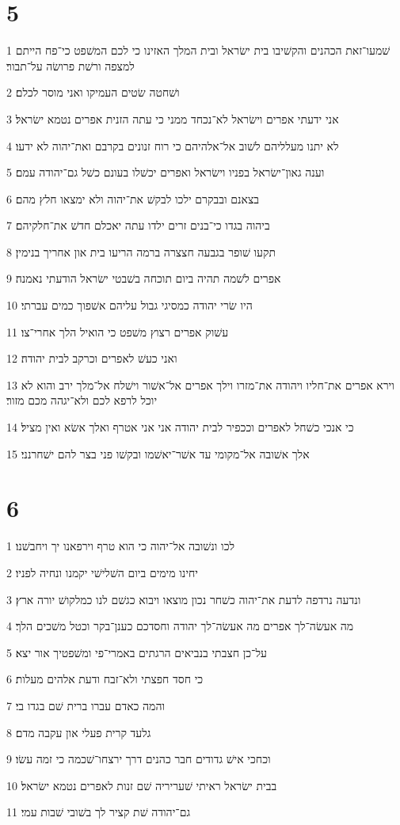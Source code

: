 \chapter{5}

\par 1 שׁמעו־זאת הכהנים והקשׁיבו בית ישׂראל ובית המלך האזינו כי לכם המשׁפט כי־פח הייתם למצפה ורשׁת פרושׂה על־תבור׃
\par 2 ושׁחטה שׂטים העמיקו ואני מוסר לכלם׃
\par 3 אני ידעתי אפרים וישׂראל לא־נכחד ממני כי עתה הזנית אפרים נטמא ישׂראל׃
\par 4 לא יתנו מעלליהם לשׁוב אל־אלהיהם כי רוח זנונים בקרבם ואת־יהוה לא ידעו׃
\par 5 וענה גאון־ישׂראל בפניו וישׂראל ואפרים יכשׁלו בעונם כשׁל גם־יהודה עמם׃
\par 6 בצאנם ובבקרם ילכו לבקשׁ את־יהוה ולא ימצאו חלץ מהם׃
\par 7 ביהוה בגדו כי־בנים זרים ילדו עתה יאכלם חדשׁ את־חלקיהם׃
\par 8 תקעו שׁופר בגבעה חצצרה ברמה הריעו בית און אחריך בנימין׃
\par 9 אפרים לשׁמה תהיה ביום תוכחה בשׁבטי ישׂראל הודעתי נאמנה׃
\par 10 היו שׂרי יהודה כמסיגי גבול עליהם אשׁפוך כמים עברתי׃
\par 11 עשׁוק אפרים רצוץ משׁפט כי הואיל הלך אחרי־צו׃
\par 12 ואני כעשׁ לאפרים וכרקב לבית יהודה׃
\par 13 וירא אפרים את־חליו ויהודה את־מזרו וילך אפרים אל־אשׁור וישׁלח אל־מלך ירב והוא לא יוכל לרפא לכם ולא־יגהה מכם מזור׃
\par 14 כי אנכי כשׁחל לאפרים וככפיר לבית יהודה אני אני אטרף ואלך אשׂא ואין מציל׃
\par 15 אלך אשׁובה אל־מקומי עד אשׁר־יאשׁמו ובקשׁו פני בצר להם ישׁחרנני׃

\chapter{6}

\par 1 לכו ונשׁובה אל־יהוה כי הוא טרף וירפאנו יך ויחבשׁנו׃
\par 2 יחינו מימים ביום השׁלישׁי יקמנו ונחיה לפניו׃
\par 3 ונדעה נרדפה לדעת את־יהוה כשׁחר נכון מוצאו ויבוא כגשׁם לנו כמלקושׁ יורה ארץ׃
\par 4 מה אעשׂה־לך אפרים מה אעשׂה־לך יהודה וחסדכם כענן־בקר וכטל משׁכים הלך׃
\par 5 על־כן חצבתי בנביאים הרגתים באמרי־פי ומשׁפטיך אור יצא׃
\par 6 כי חסד חפצתי ולא־זבח ודעת אלהים מעלות׃
\par 7 והמה כאדם עברו ברית שׁם בגדו בי׃
\par 8 גלעד קרית פעלי און עקבה מדם׃
\par 9 וכחכי אישׁ גדודים חבר כהנים דרך ירצחו־שׁכמה כי זמה עשׂו׃
\par 10 בבית ישׂראל ראיתי שׁעריריה שׁם זנות לאפרים נטמא ישׂראל׃
\par 11 גם־יהודה שׁת קציר לך בשׁובי שׁבות עמי׃

